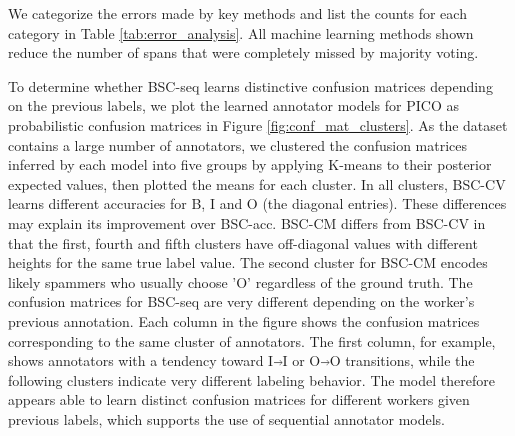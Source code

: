 We categorize the errors made by key methods and list the
counts for each category in Table \ref{tab:error_analysis}.
All machine learning methods shown reduce the number of spans that were completely missed by majority
voting. 

To determine whether BSC-seq learns distinctive confusion matrices depending on the previous labels,
we plot the learned annotator models for
PICO as probabilistic confusion matrices in Figure \ref{fig:conf_mat_clusters}.
As the dataset contains a large number of annotators, we clustered 
the confusion matrices inferred by each model
into five groups by applying K-means to their posterior expected values,
then plotted the means for each cluster.
In all clusters, BSC-CV learns different accuracies for B, I and O (the diagonal entries). 
These differences may explain its
improvement over BSC-acc.
BSC-CM differs from BSC-CV in that %
the first, fourth and fifth clusters 
have off-diagonal values with different heights for the same true label value.
 The second 
cluster for BSC-CM encodes likely spammers who usually choose 'O' regardless of the 
ground truth. 
The confusion matrices for BSC-seq are
very different depending on the worker's previous annotation. 
Each column in the figure shows the confusion matrices corresponding to the same cluster of annotators. 
The first column, for example, shows
annotators with a tendency toward I$\Arrow{0.2cm}$I or O$\Arrow{0.2cm}$O transitions, while the following clusters 
indicate very different labeling behavior. The model therefore appears able to learn
distinct confusion matrices for different workers given previous labels, which supports the use of sequential
annotator models.

